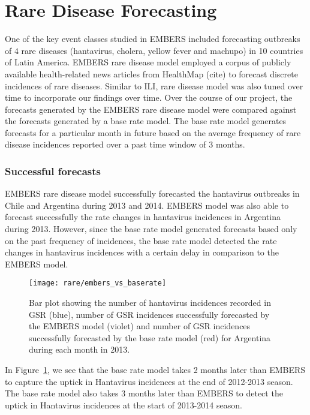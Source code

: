\section{Rare Disease Forecasting}

One of the key event classes studied in EMBERS included forecasting outbreaks
of $4$ rare diseases (hantavirus, cholera, yellow fever and machupo) in 10
countries of Latin America. EMBERS rare disease model employed a corpus of
publicly available health-related news articles from HealthMap (cite) to
forecast discrete incidences of rare diseases. Similar to ILI, rare disease
model was also tuned over time to incorporate our findings over time. Over the
course of our project, the forecasts generated by the EMBERS rare disease
model were compared against the forecasts generated by a base rate model. The
base rate model generates forecasts for a particular month in future based on
the average frequency of rare disease incidences reported over a past time
window of 3 months.


\subsubsection{Successful forecasts}

EMBERS rare disease model successfully forecasted the hantavirus outbreaks in
Chile and Argentina during 2013 and 2014. EMBERS model was also able to
forecast successfully the rate changes in hantavirus incidences in Argentina
during 2013. However, since the base rate model generated forecasts based only
on the past frequency of incidences, the base rate model detected the rate
changes in hantavirus incidences with a certain delay in comparison to the
EMBERS model. 

\begin{figure}
  \texttt{[image: rare/embers\_vs\_baserate]}
  \caption{\label{fig:embers_vs_baserate} Bar plot showing the number of
  hantavirus incidences recorded in GSR ({\color{blue}blue}),
  number of GSR incidences
  successfully forecasted by the EMBERS model ({\color{Violet}violet}) and number of GSR
  incidences successfully forecasted by the base rate model ({\color{red}red}) for
  Argentina during each month in 2013.}
\end{figure}

In Figure~\ref{fig:embers_vs_baserate}, we see that the base rate model takes
2 months later than EMBERS to capture the uptick in Hantavirus incidences at
the end of 2012-2013 season. The base rate model also takes 3 months later
than EMBERS to detect the uptick in Hantavirus incidences at the start of
2013-2014 season. 



